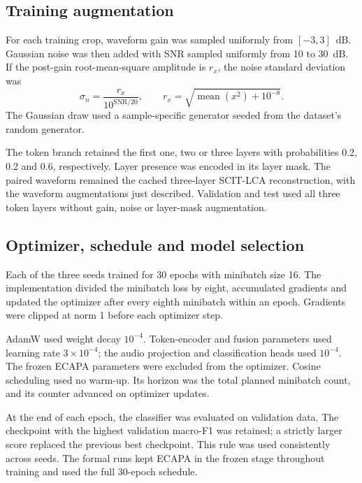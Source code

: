 \subsection{Training augmentation}
For each training crop, waveform gain was sampled uniformly from $[-3,3]$~dB. Gaussian noise was then added with SNR sampled uniformly from 10 to 30~dB. If the post-gain root-mean-square amplitude is $r_x$, the noise standard deviation was
\begin{equation}
 \sigma_n=\frac{r_x}{10^{\mathrm{SNR}/20}},
 \qquad
 r_x=\sqrt{\operatorname{mean}(x^2)+10^{-8}}.
 \label{eq:sv2-noise}
\end{equation}
The Gaussian draw used a sample-specific generator seeded from the dataset's random generator.

The token branch retained the first one, two or three layers with probabilities 0.2, 0.2 and 0.6, respectively. Layer presence was encoded in its layer mask. The paired waveform remained the cached three-layer SCIT-LCA reconstruction, with the waveform augmentations just described. Validation and test used all three token layers without gain, noise or layer-mask augmentation.

\subsection{Optimizer, schedule and model selection}
Each of the three seeds trained for 30 epochs with minibatch size 16. The implementation divided the minibatch loss by eight, accumulated gradients and updated the optimizer after every eighth minibatch within an epoch. Gradients were clipped at norm 1 before each optimizer step.

AdamW used weight decay $10^{-4}$. Token-encoder and fusion parameters used learning rate $3\times10^{-4}$; the audio projection and classification heads used $10^{-4}$. The frozen ECAPA parameters were excluded from the optimizer. Cosine scheduling used no warm-up. Its horizon was the total planned minibatch count, and its counter advanced on optimizer updates.

At the end of each epoch, the classifier was evaluated on validation data. The checkpoint with the highest validation macro-F1 was retained; a strictly larger score replaced the previous best checkpoint. This rule was used consistently across seeds. The formal runs kept ECAPA in the frozen stage throughout training and used the full 30-epoch schedule.


